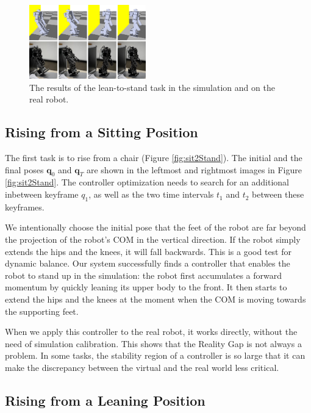 \begin{figure}[!b]
  \centering
  \includegraphics[width=0.45\textwidth]{figures/lean2Stand}
  \caption{The results of the lean-to-stand task in the simulation and on the real robot.}
  \vspace{-0.1in}
  \label{fig:lean2Stand}
\end{figure}

\subsection{Rising from a Sitting Position}

The first task is to rise from a chair (Figure \ref{fig:sit2Stand}). The initial and the final poses $\mathbf{q}_0$ and $\mathbf{q}_T$ are shown in the leftmost and rightmost images in Figure \ref{fig:sit2Stand}. The controller optimization needs to search for an additional inbetween keyframe $q_1$, as well as the two time intervals $t_1$ and $t_2$ between these keyframes. 

We intentionally choose the initial pose that the feet of the robot are far beyond the projection of the robot's COM in the vertical direction. If the robot simply extends the hips and the knees, it will fall backwards. This is a good test for dynamic balance. Our system successfully finds a controller that enables the robot to stand up in the simulation: the robot first accumulates a forward momentum by quickly leaning its upper body to the front. It then starts to extend the hips and the knees at the moment when the COM is moving towards the supporting feet.

When we apply this controller to the real robot, it works directly, without the need of simulation calibration. This shows that the Reality Gap is not always a problem. In some tasks, the stability region of a controller is so large that it can make the discrepancy between the virtual and the real world less critical.

\subsection{Rising from a Leaning Position}

